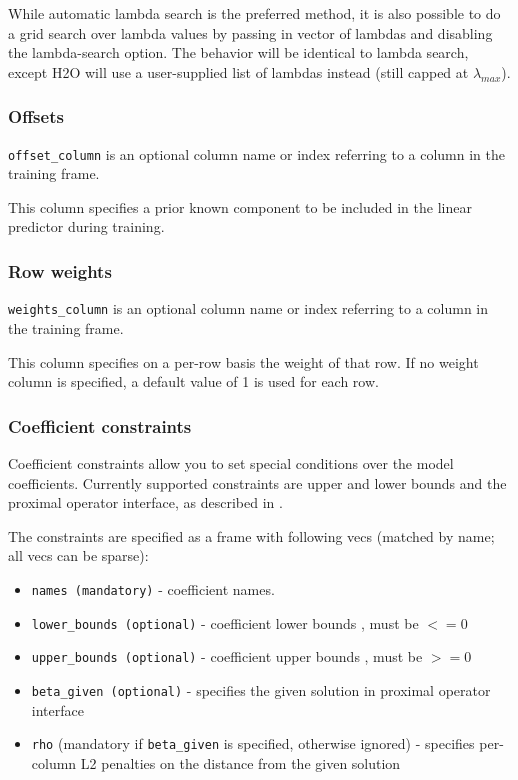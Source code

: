 While automatic lambda search is the preferred method, it is also possible to do a grid search over lambda values
by passing in vector of lambdas and disabling the lambda-search option. The behavior will be identical to lambda
search, except H2O will use a user-supplied list of lambdas instead (still capped at $\lambda_{max}$).

\bigskip
\waterExampleInR


\subsubsection{Offsets}

\texttt{offset\_column} is an optional column name or index referring to a column in the training frame.

This column specifies a prior known component to be included in the linear predictor during training.

\subsubsection{Row weights}

\texttt{weights\_column} is an optional column name or index referring to a column in the training frame.

This column specifies on a per-row basis the weight of that row.  If no weight column is specified, a default value
of 1 is used for each row.

\subsubsection{Coefficient constraints}

Coefficient constraints allow you to set special conditions over the model coefficients. Currently supported
constraints are upper and lower bounds and the proximal operator interface, as described in .

The constraints are specified as a frame with following vecs (matched by name; all vecs can be sparse):

\begin{itemize}
\item \texttt{names (mandatory)}  - coefficient names. 
\item \texttt{lower\_bounds (optional)} - coefficient lower bounds , must be $<= 0$
\item \texttt{upper\_bounds (optional)} - coefficient upper bounds , must be $>= 0$
\item \texttt{beta\_given (optional)} - specifies the given solution in proximal operator interface
\item \texttt{rho} (mandatory if \texttt{beta\_given} is specified, otherwise ignored) - specifies per-column L2 penalties on the distance from the given solution
\end{itemize}
 
